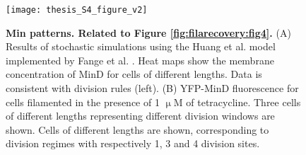 \newpage

\begin{figure}
	\centering
	\texttt{[image: thesis\_S4\_figure\_v2]}
	\caption{
        \label{fig:filarecovery:figsupp4}
		\textbf{%
            Min patterns. Related to Figure \ref{fig:filarecovery:fig4}.} 
		(A) Results of stochastic simulations using the Huang et al. model implemented by Fange et al. \cite{Huang2003, Fange2006}. Heat maps show the membrane concentration of MinD for cells of different lengths. Data is consistent with division rules (left). (B) YFP-MinD fluorescence for cells filamented in the presence of 1 $\upmu$M of tetracycline. Three cells of different lengths representing different division windows are shown. Cells of different lengths are shown, corresponding to division regimes with respectively 1, 3 and 4 division sites. 
	}	
\end{figure}	






%
%	
%	
%	
%	

%
%

%
